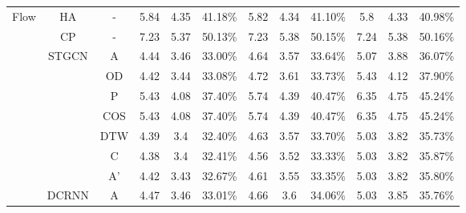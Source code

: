 \begin{table}[t!]
\begin{center}
{\begin{tabular}{c|c|c|ccc|ccc|ccc}
                \multirow{23}{*}{Flow}           & HA                     & -                       & 5.84       & 4.35      & 41.18\%     & 5.82      & 4.34      & 41.10\%     & 5.8        & 4.33       & 40.98\%     \\
                                                 & CP                     & -                       & 7.23       & 5.37      & 50.13\%     & 7.23      & 5.38      & 50.15\%     & 7.24       & 5.38       & 50.16\%     \\
                \cline{2-12}
                                                 & \multirow{7}{*}{STGCN} & A                       & 4.44       & 3.46      & 33.00\%     & 4.64      & 3.57      & 33.64\%     & 5.07       & 3.88       & 36.07\%     \\
                                                 &                        & OD                      & 4.42       & 3.44      & 33.08\%     & 4.72      & 3.61      & 33.73\%     & 5.43       & 4.12       & 37.90\%     \\
                                                 &                        & P                       & 5.43       & 4.08      & 37.40\%     & 5.74      & 4.39      & 40.47\%     & 6.35       & 4.75       & 45.24\%     \\
                                                 &                        & COS                     & 5.43       & 4.08      & 37.40\%     & 5.74      & 4.39      & 40.47\%     & 6.35       & 4.75       & 45.24\%     \\
                                                 &                        & DTW                     & 4.39       & 3.4       & 32.40\%     & 4.63      & 3.57      & 33.70\%     & 5.03       & 3.82       & 35.73\%     \\
                                                 &                        & C                       & 4.38       & 3.4       & 32.41\%     & 4.56      & 3.52      & 33.33\%     & 5.03       & 3.82       & 35.87\%     \\
                                                 &                        & A'                      & 4.42       & 3.43      & 32.67\%     & 4.61      & 3.55      & 33.35\%     & 5.03       & 3.82       & 35.80\%     \\
                \cline{2-12}
                                                 & \multirow{7}{*}{DCRNN} & A                       & 4.47       & 3.46      & 33.01\%     & 4.66      & 3.6       & 34.06\%     & 5.03       & 3.85       & 35.76\%     \\

\end{tabular}}
\end{center}
\end{table}
